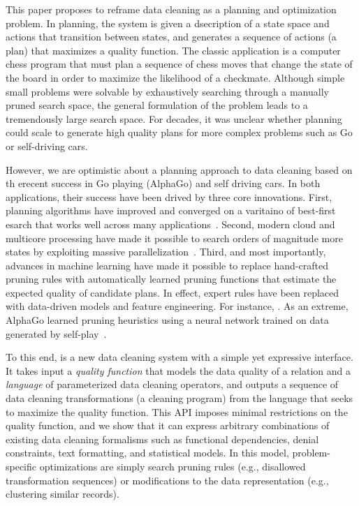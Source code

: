 This paper proposes to reframe data cleaning as a planning and optimization problem.  In planning, the system is given a dsecription of a state space and actions that transition between states, and generates a sequence of actions (a plan) that maximizes a quality function. The classic application is a computer chess program that must plan a sequence of chess moves that change the state of the board in order to maximize the likelihood of a checkmate. Although simple small problems were solvable by exhaustively searching through a manually pruned search space, the general formulation of the problem leads to a tremendously large search space.  For decades, it was unclear whether planning could scale to generate high quality plans for more complex problems such as Go or self-driving cars.

However, we are optimistic about a planning approach to data cleaning based on th erecent success in Go playing (AlphaGo) and self driving cars.  In both applications, their success have been drived by three core innovations.  First, planning algorithms have improved and converged on a varitaino of best-first esarch that works well across many applications~\cite{}.  Second, modern cloud and multicore processing have made it possible to search orders of magnitude more states by exploiting massive parallelization~\cite{}.  Third, and most importantly, advances in machine learning have made it possible to replace hand-crafted pruning rules with automatically learned pruning functions that estimate the expected quality of candidate plans.  In effect, expert rules have been replaced with data-driven models and feature engineering.  For instance, .  As an extreme, AlphaGo learned pruning heuristics using a neural network trained on data generated by self-play~\cite{alphago}.   

To this end, \sys is a new data cleaning system with a simple yet expressive interface.  It takes input a {\it quality function} that models the data quality of a relation and a {\it language} of parameterized data cleaning operators, and outputs a sequence of data cleaning transformations (a cleaning program) from the language that seeks to maximize the quality function.  This API imposes minimal restrictions on the quality function, and we show that it can express arbitrary combinations of existing data cleaning formalisms such as functional dependencies, denial constraints, text formatting, and statistical models.  In this model, problem-specific optimizations are simply search pruning rules (e.g., disallowed transformation sequences) or modifications to the data representation (e.g., clustering similar records).  

